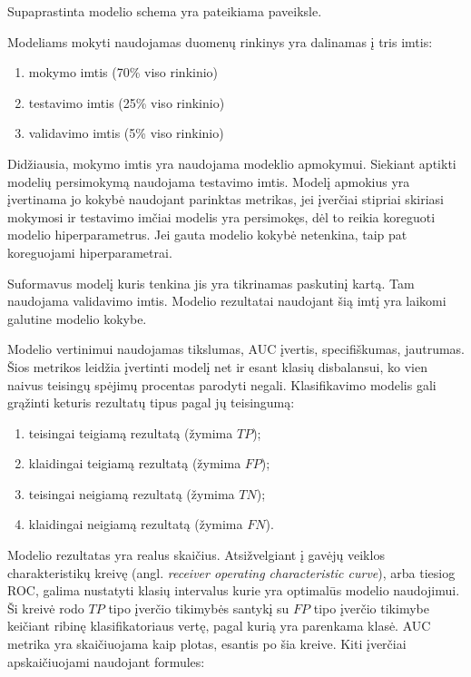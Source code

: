 
Supaprastinta modelio schema yra pateikiama  paveiksle.

Modeliams mokyti naudojamas duomenų rinkinys yra dalinamas į tris imtis:
\begin{enumerate}
    \item mokymo imtis (70\% viso rinkinio)
    \item testavimo imtis (25\% viso rinkinio)
    \item validavimo imtis (5\% viso rinkinio)
\end{enumerate}
 Didžiausia, mokymo imtis yra naudojama modeklio apmokymui. Siekiant aptikti modelių persimokymą naudojama testavimo imtis. Modelį apmokius yra įvertinama jo kokybė naudojant parinktas metrikas, jei įverčiai stipriai skiriasi mokymosi ir testavimo imčiai modelis yra persimokęs, dėl to reikia koreguoti modelio hiperparametrus. Jei gauta modelio kokybė netenkina,  taip pat koreguojami hiperparametrai.

 Suformavus modelį kuris tenkina jis yra tikrinamas paskutinį kartą. Tam naudojama validavimo imtis. Modelio rezultatai naudojant šią imtį yra laikomi galutine modelio kokybe.


Modelio vertinimui naudojamas tikslumas, AUC įvertis, specifiškumas, jautrumas. Šios metrikos leidžia įvertinti modelį net ir esant klasių disbalansui, ko vien naivus teisingų spėjimų procentas parodyti negali. Klasifikavimo modelis gali grąžinti keturis rezultatų tipus pagal jų teisingumą:
\begin{enumerate}
    \item teisingai teigiamą rezultatą (žymima $TP$);
    \item klaidingai teigiamą rezultatą (žymima $FP$);
    \item teisingai neigiamą rezultatą (žymima $TN$);
    \item klaidingai neigiamą rezultatą (žymima $FN$).
\end{enumerate}

 Modelio rezultatas yra realus skaičius. Atsižvelgiant į gavėjų veiklos charakteristikų kreivę (angl. \textit{receiver operating characteristic curve}), arba tiesiog ROC, galima nustatyti klasių intervalus kurie yra optimalūs modelio naudojimui. Ši kreivė rodo $TP$ tipo įverčio tikimybės santykį su $FP$ tipo įverčio tikimybe keičiant ribinę klasifikatoriaus vertę, pagal kurią yra parenkama klasė. AUC metrika yra skaičiuojama kaip plotas, esantis po šia kreive. Kiti įverčiai apskaičiuojami naudojant formules:

